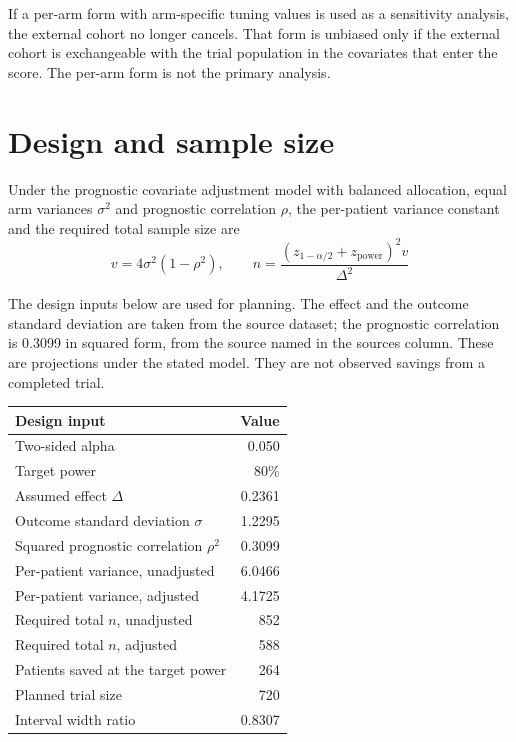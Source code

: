 \documentclass[11pt]{article}
\begin{document}
If a per-arm form with arm-specific tuning values is used as a sensitivity
analysis, the external cohort no longer cancels. That form is unbiased only if
the external cohort is exchangeable with the trial population in the covariates
that enter the score. The per-arm form is not the primary analysis.

\section{Design and sample size}

Under the prognostic covariate adjustment model with balanced allocation, equal
arm variances $\sigma^{2}$ and prognostic correlation $\rho$, the per-patient
variance constant and the required total sample size are
\begin{equation}v = 4\sigma^{2}\left(1 - \rho^{2}\right), \qquad n = \frac{\left(z_{1-\alpha/2} + z_{\mathrm{power}}\right)^{2} v}{\Delta^{2}}\end{equation}

The design inputs below are used for planning. The effect and the outcome
standard deviation are taken from the source dataset; the prognostic correlation
is 0.3099 in squared form, from the source named in the
sources column. These are projections under the stated model. They are not
observed savings from a completed trial.

\begin{center}
\begin{tabular}{lr}
\toprule
Design input & Value \\
\midrule
Two-sided alpha & 0.050 \\
Target power & 80\% \\
Assumed effect $\Delta$ & 0.2361 \\
Outcome standard deviation $\sigma$ & 1.2295 \\
Squared prognostic correlation $\rho^{2}$ & 0.3099 \\
Per-patient variance, unadjusted & 6.0466 \\
Per-patient variance, adjusted & 4.1725 \\
Required total $n$, unadjusted & 852 \\
Required total $n$, adjusted & 588 \\
Patients saved at the target power & 264 \\
Planned trial size & 720 \\
Interval width ratio & 0.8307 \\
\bottomrule
\end{tabular}
\end{center}
\end{document}
